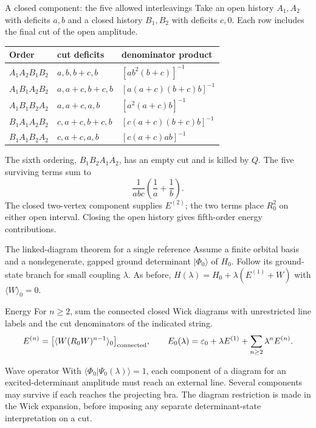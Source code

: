 \documentclass[aspectratio=169,10pt]{beamer}
\newcommand{\ket}[1]{\vert #1\rangle}
\newcommand{\braket}[2]{\langle #1\vert #2\rangle}
\newcommand{\av}[1]{\langle #1\rangle_0}
\newcommand{\ph}{\Phi_0}
\begin{document}
\begin{frame}{A closed component: the five allowed interleavings}
Take an open history $A_1,A_2$ with deficits $a,b$ and a closed history $B_1,B_2$ with deficits $c,0$. Each row includes the final cut of the open amplitude.
\begin{center}
\setlength{\tabcolsep}{12pt}\begin{tabular}{lll}
\toprule
Order & cut deficits & denominator product\\
\midrule
$A_1A_2B_1B_2$ & $a,b,b+c,b$ & $[ab^2(b+c)]^{-1}$\\
$A_1B_1A_2B_2$ & $a,a+c,b+c,b$ & $[a(a+c)(b+c)b]^{-1}$\\
$A_1B_1B_2A_2$ & $a,a+c,a,b$ & $[a^2(a+c)b]^{-1}$\\
$B_1A_1A_2B_2$ & $c,a+c,b+c,b$ & $[c(a+c)(b+c)b]^{-1}$\\
$B_1A_1B_2A_2$ & $c,a+c,a,b$ & $[c(a+c)ab]^{-1}$\\
\bottomrule
\end{tabular}
\end{center}
The sixth ordering, $B_1B_2A_1A_2$, has an empty cut and is killed by $Q$. The five surviving terms sum to
\[
 \frac1{abc}\left(\frac1a+\frac1b\right).
\]
The closed two-vertex component supplies $E^{(2)}$; the two terms place $R_0^2$ on either open interval. Closing the open history gives fifth-order energy contributions.
\end{frame}


\begin{frame}{The linked-diagram theorem for a single reference}
\small
Assume a finite orbital basis and a nondegenerate, gapped ground determinant $\ket{\ph}$ of $H_0$. Follow its ground-state branch for small coupling $\lambda$. As before,
$H(\lambda)=H_0+\lambda(E^{(1)}+W)$ with $\av{W}=0$.
\begin{block}{Energy}
For $n\ge2$, sum the connected closed Wick diagrams with unrestricted line labels and the cut denominators of the indicated string.
\[
 E^{(n)}=\big[\av{W(R_0W)^{n-1}}\big]_{\rm connected},
 \qquad E_0(\lambda)=\varepsilon_0+\lambda E^{(1)}+\sum_{n\ge2}\lambda^n E^{(n)} .
\]
\end{block}
\begin{block}{Wave operator}
With $\braket{\ph}{\Psi_0(\lambda)}=1$, each component of a diagram for an excited-determinant amplitude must reach an external line. Several components may survive if each reaches the projecting bra. The diagram restriction is made in the Wick expansion, before imposing any separate determinant-state interpretation on a cut.
\end{block}
\end{frame}
\end{document}
